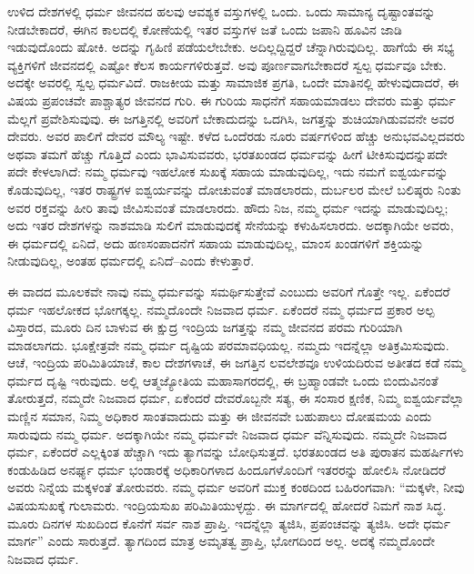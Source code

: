 ಉಳಿದ ದೇಶಗಳಲ್ಲಿ ಧರ್ಮ ಜೀವನದ ಹಲವು ಆವಶ್ಯಕ ವಸ್ತುಗಳಲ್ಲಿ ಒಂದು. ಒಂದು ಸಾಮಾನ್ಯ ದೃಷ್ಟಾಂತವನ್ನು ನೀಡಬೇಕಾದರೆ, ಈಗಿನ ಕಾಲದಲ್ಲಿ ಕೋಣೆಯಲ್ಲಿ ಇತರ ವಸ್ತುಗಳ ಜತೆ ಒಂದು ಜಪಾನಿ ಹೂವಿನ ಜಾಡಿ ಇಡುವುದೊಂದು ಷೋಕಿ. ಅದನ್ನು ಗೃಹಿಣಿ ಪಡೆಯಲೇಬೇಕು. ಅದಿಲ್ಲದ್ದಿದ್ದರೆ ಚೆನ್ನಾಗಿರುವುದಿಲ್ಲ. ಹಾಗೆಯೆ ಈ ಸಭ್ಯ ವ್ಯಕ್ತಿಗಳಿಗೆ ಜೀವನದಲ್ಲಿ ಎಷ್ಟೋ ಕೆಲಸ ಕಾರ್ಯಗಳಿರುತ್ತವೆ. ಅವು ಪೂರ್ಣವಾಗಬೇಕಾದರೆ ಸ್ವಲ್ಪ ಧರ್ಮವೂ ಬೇಕು. ಅದಕ್ಕೇ ಅವರಲ್ಲಿ ಸ್ವಲ್ಪ ಧರ್ಮವಿದೆ. ರಾಜಕೀಯ ಮತ್ತು ಸಾಮಾಜಿಕ ಪ್ರಗತಿ, ಒಂದೇ ಮಾತಿನಲ್ಲಿ ಹೇಳುವುದಾದರೆ, ಈ ವಿಷಯ ಪ್ರಪಂಚವೇ ಪಾಶ್ಚಾತ್ಯರ ಜೀವನದ ಗುರಿ. ಈ ಗುರಿಯ ಸಾಧನೆಗೆ ಸಹಾಯಮಾಡಲು ದೇವರು ಮತ್ತು ಧರ್ಮ ಮೆಲ್ಲಗೆ ಪ್ರವೇಶಿಸುವುವು. ಈ ಜಗತ್ತಿನಲ್ಲಿ ಅವರಿಗೆ ಬೇಕಾದುದನ್ನು ಒದಗಿಸಿ, ಜಗತ್ತನ್ನು ಶುಚಿಯಾಗಿಡುವವನೇ ಅವರ ದೇವರು. ಅವರ ಪಾಲಿಗೆ ದೇವರ ಮೌಲ್ಯ ಇಷ್ಟೇ. ಕಳೆದ ಒಂದೆರಡು ನೂರು ವರ್ಷಗಳಿಂದ ಹೆಚ್ಚು ಅನುಭವವಿಲ್ಲದವರು ಅಥವಾ ತಮಗೆ ಹೆಚ್ಚು ಗೊತ್ತಿದೆ ಎಂದು ಭಾವಿಸುವವರು, ಭರತಖಂಡದ ಧರ್ಮವನ್ನು ಹೀಗೆ ಟೀಕಿಸುವುದನ್ನುಪದೇ ಪದೇ ಕೇಳಲಾಗಿದೆ: ನಮ್ಮ ಧರ್ಮವು ಇಹಲೋಕ ಸುಖಕ್ಕೆ ಸಹಾಯ ಮಾಡುವುದಿಲ್ಲ, ಇದು ನಮಗೆ ಐಶ್ವರ್ಯವನ್ನು ಕೊಡುವುದಿಲ್ಲ, ಇತರ ರಾಷ್ಟ್ರಗಳ ಐಶ್ವರ್ಯವನ್ನು ದೋಚುವಂತೆ ಮಾಡಲಾರದು, ದುರ್ಬಲರ ಮೇಲೆ ಬಲಿಷ್ಠರು ನಿಂತು ಅವರ ರಕ್ತವನ್ನು ಹೀರಿ ತಾವು ಜೀವಿಸುವಂತೆ ಮಾಡಲಾರದು. ಹೌದು ನಿಜ, ನಮ್ಮ ಧರ್ಮ ಇದನ್ನು ಮಾಡುವುದಿಲ್ಲ; ಅದು ಇತರ ದೇಶಗಳನ್ನು ನಾಶಮಾಡಿ ಸುಲಿಗೆ ಮಾಡುವುದಕ್ಕೆ ಸೇನೆಯನ್ನು ಕಳುಹಿಸಲಾರದು. ಅದಕ್ಕಾಗಿಯೇ ಅವರು, ಈ ಧರ್ಮದಲ್ಲಿ ಏನಿದೆ, ಅದು ಹಣಸಂಪಾದನೆಗೆ ಸಹಾಯ ಮಾಡುವುದಿಲ್ಲ, ಮಾಂಸ ಖಂಡಗಳಿಗೆ ಶಕ್ತಿಯನ್ನು ನೀಡುವುದಿಲ್ಲ, ಅಂತಹ ಧರ್ಮದಲ್ಲಿ ಏನಿದೆ–ಎಂದು ಕೇಳುತ್ತಾರೆ. 

ಈ ವಾದದ ಮೂಲಕವೇ ನಾವು ನಮ್ಮ ಧರ್ಮವನ್ನು ಸಮರ್ಥಿಸುತ್ತೇವೆ ಎಂಬುದು ಅವರಿಗೆ ಗೊತ್ತೇ ಇಲ್ಲ. ಏಕೆಂದರೆ ಧರ್ಮ ಇಹಲೋಕದ ಭೋಗಕ್ಕಲ್ಲ. ನಮ್ಮದೊಂದೇ ನಿಜವಾದ ಧರ್ಮ. ಏಕೆಂದರೆ ನಮ್ಮ ಧರ್ಮದ ಪ್ರಕಾರ ಅಲ್ಪ ವಿಸ್ತಾರದ, ಮೂರು ದಿನ ಬಾಳುವ ಈ ಕ್ಷುದ್ರ ಇಂದ್ರಿಯ ಜಗತ್ತನ್ನು ನಮ್ಮ ಜೀವನದ ಪರಮ ಗುರಿಯಾಗಿ ಮಾಡಲಾಗದು. ಭೂಕ್ಷೇತ್ರವೇ ನಮ್ಮ ಧರ್ಮ ದೃಷ್ಟಿಯ ಪರಮಾವಧಿಯಲ್ಲ. ನಮ್ಮದು ಇದನ್ನೆಲ್ಲಾ ಅತಿಕ್ರಮಿಸುವುದು. ಆಚೆ, ಇಂದ್ರಿಯ ಪರಿಮಿತಿಯಾಚೆ, ಕಾಲ ದೇಶಗಳಾಚೆ, ಈ ಜಗತ್ತಿನ ಲವಲೇಶವೂ ಉಳಿಯದಿರುವ ಅತೀತದ ಕಡೆ ನಮ್ಮ ಧರ್ಮದ ದೃಷ್ಟಿ ಇರುವುದು. ಅಲ್ಲಿ ಆತ್ಮಜ್ಯೋತಿಯ ಮಹಾಸಾಗರದಲ್ಲಿ, ಈ ಬ್ರಹ್ಮಾಂಡವೇ ಒಂದು ಬಿಂದುವಿನಂತೆ ತೋರುತ್ತದೆ, ನಮ್ಮದೇ ನಿಜವಾದ ಧರ್ಮ, ಏಕೆಂದರೆ ದೇವರೊಬ್ಬನೇ ಸತ್ಯ, ಈ ಸಂಸಾರ ಕ್ಷಣಿಕ, ನಿಮ್ಮ ಐಶ್ವರ್ಯವೆಲ್ಲಾ ಮಣ್ಣಿನ ಸಮಾನ, ನಿಮ್ಮ ಅಧಿಕಾರ ಸಾಂತವಾದುದು ಮತ್ತು ಈ ಜೀವನವೇ ಬಹುಪಾಲು ದೋಷಮಯ ಎಂದು ಸಾರುವುದು ನಮ್ಮ ಧರ್ಮ. ಅದಕ್ಕಾಗಿಯೇ ನಮ್ಮ ಧರ್ಮವೇ ನಿಜವಾದ ಧರ್ಮ ವೆನ್ನಿಸುವುದು. ನಮ್ಮದೇ ನಿಜವಾದ ಧರ್ಮ, ಏಕೆಂದರೆ ಎಲ್ಲಕ್ಕಿಂತ ಹೆಚ್ಚಾಗಿ ಇದು ತ್ಯಾಗವನ್ನು ಬೋಧಿಸುತ್ತದೆ. ಭರತಖಂಡದ ಅತಿ ಪುರಾತನ ಮಹರ್ಷಿಗಳು ಕಂಡುಹಿಡಿದ ಅನರ್ಘ್ಯ ಧರ್ಮ ಭಂಡಾರಕ್ಕೆ ಅಧಿಕಾರಿಗಳಾದ ಹಿಂದೂಗಳೊಂದಿಗೆ ಇತರರನ್ನು ಹೋಲಿಸಿ ನೋಡಿದರೆ ಅವರು ನಿನ್ನೆಯ ಮಕ್ಕಳಂತೆ ತೋರುವರು. ನಮ್ಮ ಧರ್ಮ ಅವರಿಗೆ ಮುಕ್ತ ಕಂಠದಿಂದ ಬಹಿರಂಗವಾಗಿ: “ಮಕ್ಕಳೇ, ನೀವು ವಿಷಯಸುಖಕ್ಕೆ ಗುಲಾಮರು. ಇಂದ್ರಿಯಸುಖ ಪರಿಮಿತಿಯುಳ್ಳದ್ದು. ಈ ಮಾರ್ಗದಲ್ಲಿ ಹೋದರೆ ನಿಮಗೆ ನಾಶ ಸಿದ್ಧ. ಮೂರು ದಿನಗಳ ಸುಖದಿಂದ ಕೊನೆಗೆ ಸರ್ವ ನಾಶ ಪ್ರಾಪ್ತಿ. ಇದನ್ನೆಲ್ಲಾ ತ್ಯಜಿಸಿ, ಪ್ರಪಂಚವನ್ನು ತ್ಯಜಿಸಿ. ಅದೇ ಧರ್ಮ ಮಾರ್ಗ” ಎಂದು ಸಾರುತ್ತದೆ. ತ್ಯಾಗದಿಂದ ಮಾತ್ರ ಅಮೃತತ್ವ ಪ್ರಾಪ್ತಿ, ಭೋಗದಿಂದ ಅಲ್ಲ. ಅದಕ್ಕೆ ನಮ್ಮದೊಂದೇ ನಿಜವಾದ ಧರ್ಮ. 

